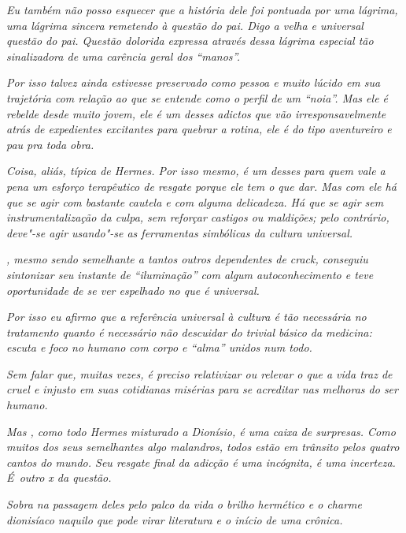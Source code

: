 \emph{Eu também não posso esquecer que a história dele foi pontuada por
uma lágrima, uma lágrima sincera remetendo à questão do pai. Digo a velha
e universal questão do pai. Questão dolorida expressa através dessa
lágrima especial tão sinalizadora de uma carência geral dos ``manos''.}

\emph{Por isso  talvez ainda estivesse preservado como pessoa e muito
lúcido em sua trajetória com relação ao que se entende como o perfil de
um ``noia''. Mas ele é rebelde desde muito jovem, ele é um desses
adictos que vão irresponsavelmente atrás de expedientes excitantes para
quebrar a rotina, ele é do tipo aventureiro e pau pra toda obra.}

\emph{Coisa, aliás, típica de Hermes. Por isso mesmo,  é um desses
para quem vale a pena um esforço terapêutico de resgate porque ele tem o
que dar. Mas com ele há que se agir com bastante cautela e com alguma
delicadeza. Há que se agir sem instrumentalização da culpa, sem reforçar
castigos ou maldições; pelo contrário, deve"-se agir usando"-se as
ferramentas simbólicas da cultura universal.}

\emph{, mesmo sendo semelhante a tantos outros dependentes de crack,
conseguiu sintonizar seu instante de ``iluminação'' com algum
autoconhecimento e teve oportunidade de se ver espelhado no que é
universal.}

\emph{Por isso eu afirmo que a referência universal à cultura é tão
necessária no tratamento quanto é necessário não descuidar do trivial
básico da medicina: escuta e foco no humano com corpo e ``alma'' unidos
num todo.}

\emph{Sem falar que, muitas vezes, é preciso relativizar ou relevar o
que a vida traz de cruel e injusto em suas cotidianas misérias para se
acreditar nas melhoras do ser humano.}

\emph{Mas , como todo Hermes misturado a Dionísio, é uma caixa de
surpresas. Como muitos dos seus semelhantes algo malandros, todos estão
em trânsito pelos quatro cantos do mundo. Seu resgate final da adicção é
uma incógnita, é uma incerteza. É~outro x da questão.}

\emph{Sobra na passagem deles pelo palco da vida o brilho hermético e o
charme dionisíaco naquilo que pode virar literatura e o início de uma
crônica.~}
\endgroup